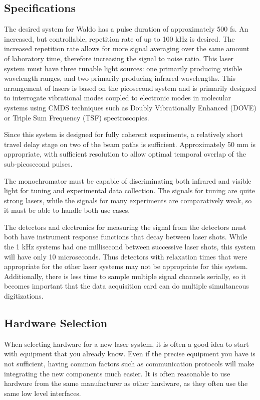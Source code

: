 \subsection{Specifications}

The desired system for Waldo has a pulse duration of approximately 500 fs.
An increased, but controllable, repetition rate of up to 100 kHz is desired.
The increased repetition rate allows for more signal averaging over the same amount of laboratory time, therefore increasing the signal to noise ratio.
This laser system must have three tunable light sources: one primarily producing visible wavelength ranges, and two primarily producing infrared wavelengths.
This arrangement of lasers is based on the picosecond system and is primarily designed to interrogate vibrational modes coupled to electronic modes in molecular systems using CMDS techniques such as Doubly Vibrationally Enhanced (DOVE) or Triple Sum Frequency (TSF) spectroscopies.

Since this system is designed for fully coherent experiments, a relatively short travel delay stage on two of the beam paths is sufficient.
Approximately 50 mm is appropriate, with sufficient resolution to allow optimal temporal overlap of the sub-picosecond pulses.

The monochromator must be capable of discriminating both infrared and visible light for tuning and experimental data collection.
The signals for tuning are quite strong lasers, while the signals for many experiments are comparatively weak, so it must be able to handle both use cases.

The detectors and electronics for measuring the signal from the detectors must both have instrument response functions that decay between laser shots.
While the 1 kHz systems had one millisecond between successive laser shots, this system will have only 10 microseconds.
Thus detectors with relaxation times that were appropriate for the other laser systems may not be appropriate for this system.
Additionally, there is less time to sample multiple signal channels serially, so it becomes important that the data acquisition card can do multiple simultaneous digitizations.


\subsection{Hardware Selection}

When selecting hardware for a new laser system, it is often a good idea to start with equipment that you already know.
Even if the precise equipment you have is not sufficient, having common factors such as communication protocols will make integrating the new components much easier.
It is often reasonable to use hardware from the same manufacturer as other hardware, as they often use the same low level interfaces.

